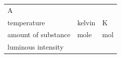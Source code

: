 {\begin{center}
\begin{xtabular*}{\mytablewidth}[t]{|p{10\mystarwidth}|p{10\mystarwidth}|p{10\mystarwidth}|}
        A%
     \tabularnewline{}
    
    
        temperature &
    
    
        kelvin &
    
    
        K%
     \tabularnewline{}
    
    
        amount of substance &
    
    
        mole &
    
    
        mol%
     \tabularnewline{}
    
    
        luminous intensity &
    

\end{xtabular*}
\end{center}}
